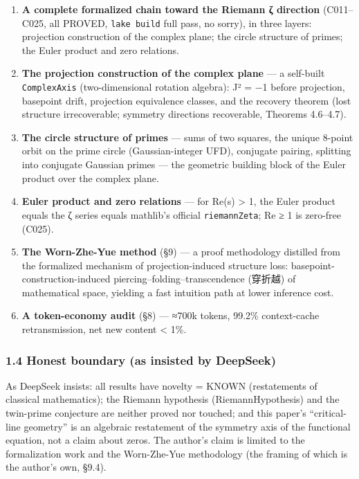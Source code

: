 \documentclass[
]{article}
\providecommand{\tightlist}{%
  \setlength{\itemsep}{0pt}\setlength{\parskip}{0pt}}
\begin{document}
\begin{enumerate}
\def\labelenumi{\arabic{enumi}.}
\tightlist
\item
  \textbf{A complete formalized chain toward the Riemann ζ direction}
  (C011--C025, all PROVED, \texttt{lake\ build} full pass, no sorry), in
  three layers: projection construction of the complex plane; the circle
  structure of primes; the Euler product and zero relations.
\item
  \textbf{The projection construction of the complex plane} --- a
  self-built \texttt{ComplexAxis} (two-dimensional rotation algebra): J²
  = −1 before projection, basepoint drift, projection equivalence
  classes, and the recovery theorem (lost structure irrecoverable;
  symmetry directions recoverable, Theorems 4.6--4.7).
\item
  \textbf{The circle structure of primes} --- sums of two squares, the
  unique 8-point orbit on the prime circle (Gaussian-integer UFD),
  conjugate pairing, splitting into conjugate Gaussian primes --- the
  geometric building block of the Euler product over the complex plane.
\item
  \textbf{Euler product and zero relations} --- for Re(s) \textgreater{}
  1, the Euler product equals the ζ series equals mathlib's official
  \texttt{riemannZeta}; Re ≥ 1 is zero-free (C025).
\item
  \textbf{The Worn-Zhe-Yue method} (§9) --- a proof methodology
  distilled from the formalized mechanism of projection-induced
  structure loss: basepoint-construction-induced
  piercing--folding--transcendence (穿折越) of mathematical space,
  yielding a fast intuition path at lower inference cost.
\item
  \textbf{A token-economy audit} (§8) --- ≈700k tokens, 99.2\%
  context-cache retransmission, net new content \textless{} 1\%.
\end{enumerate}

\subsubsection{1.4 Honest boundary (as insisted by
DeepSeek)}\label{honest-boundary-as-insisted-by-deepseek}

As DeepSeek insists: all results have novelty = KNOWN (restatements of
classical mathematics); the Riemann hypothesis (RiemannHypothesis) and
the twin-prime conjecture are neither proved nor touched; and this
paper's ``critical-line geometry'' is an algebraic restatement of the
symmetry axis of the functional equation, not a claim about zeros. The
author's claim is limited to the formalization work and the Worn-Zhe-Yue
methodology (the framing of which is the author's own, §9.4).
\end{document}
